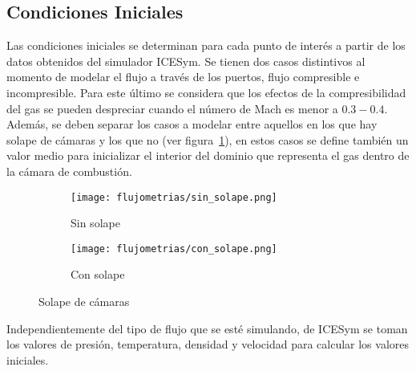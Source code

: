\subsection{Condiciones Iniciales}\label{cap2:cond_iniciales}
%
Las condiciones iniciales se determinan para cada punto de interés a partir de
los datos obtenidos del simulador ICESym.
%
Se tienen dos casos distintivos al momento de modelar el flujo a través de los
puertos, flujo compresible e incompresible.
%
Para este último se considera que los efectos de la compresibilidad del gas se
pueden despreciar cuando el número de Mach es menor a $0.3-0.4$.
%
Además, se deben separar los casos a modelar entre aquellos en los que hay
solape de cámaras y los que no (ver figura~\ref{fig:solape}), en estos casos se
define también un valor medio para inicializar el interior del dominio que
representa el gas dentro de la cámara de combustión.

\begin{figure}[t!]
  \centering
    \begin{subfigure}[t]{0.4\textwidth}
        \centering
        \texttt{[image: flujometrias/sin\_solape.png]}
        \caption{Sin solape}
    \end{subfigure}%
    \begin{subfigure}[t]{0.4\textwidth}
        \centering
        \texttt{[image: flujometrias/con\_solape.png]}
        \caption{Con solape}
    \end{subfigure}
  \caption{Solape de cámaras}\label{fig:solape}
\end{figure}

Independientemente del tipo de flujo que se esté simulando, de ICESym se toman
los valores de presión, temperatura, densidad y velocidad para calcular los
valores iniciales.
%

